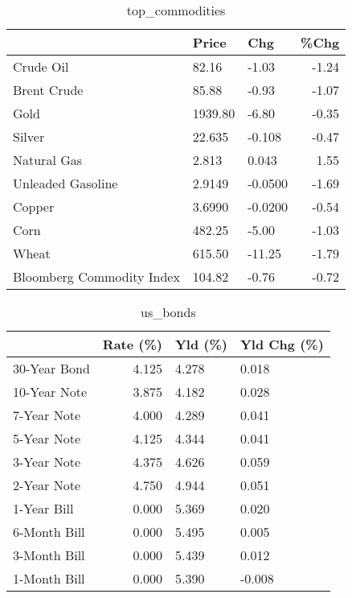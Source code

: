 \documentclass{article}%
\begin{document}
\begin{table}[htbp]%
\caption{top\_commodities}%
\centering%
\begin{adjustbox}{width=1\textwidth}%
\begin{tabular}{lllr}
\toprule
                          &   Price &     Chg &  \%Chg \\
\midrule
               Crude Oil  &   82.16 &   -1.03 & -1.24 \\
             Brent Crude  &   85.88 &   -0.93 & -1.07 \\
                    Gold  & 1939.80 &   -6.80 & -0.35 \\
                  Silver  &  22.635 &  -0.108 & -0.47 \\
             Natural Gas  &   2.813 &   0.043 &  1.55 \\
       Unleaded Gasoline  &  2.9149 & -0.0500 & -1.69 \\
                  Copper  &  3.6990 & -0.0200 & -0.54 \\
                    Corn  &  482.25 &   -5.00 & -1.03 \\
                   Wheat  &  615.50 &  -11.25 & -1.79 \\
Bloomberg Commodity Index &  104.82 &   -0.76 & -0.72 \\
\bottomrule
\end{tabular}
%
\end{adjustbox}%
\end{table}

%


\begin{table}[htbp]%
\caption{us\_bonds}%
\centering%
\begin{adjustbox}{width=1\textwidth}%
\begin{tabular}{lrll}
\toprule
             &  Rate (\%) & Yld (\%) & Yld Chg (\%) \\
\midrule
30-Year Bond &     4.125 &   4.278 &       0.018 \\
10-Year Note &     3.875 &   4.182 &       0.028 \\
 7-Year Note &     4.000 &   4.289 &       0.041 \\
 5-Year Note &     4.125 &   4.344 &       0.041 \\
 3-Year Note &     4.375 &   4.626 &       0.059 \\
 2-Year Note &     4.750 &   4.944 &       0.051 \\
 1-Year Bill &     0.000 &   5.369 &       0.020 \\
6-Month Bill &     0.000 &   5.495 &       0.005 \\
3-Month Bill &     0.000 &   5.439 &       0.012 \\
1-Month Bill &     0.000 &   5.390 &      -0.008 \\
\bottomrule
\end{tabular}
%
\end{adjustbox}%
\end{table}
\end{document}
